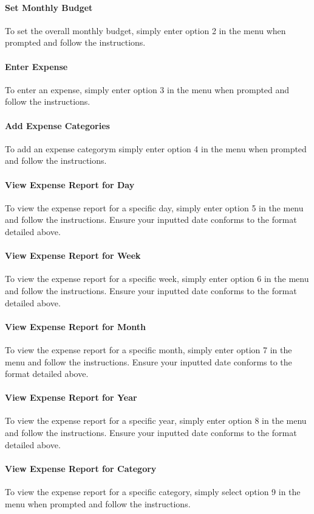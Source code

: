 \documentclass[12pt]{article}
\begin{document}
  \paragraph{Set Monthly Budget}
  To set the overall monthly budget, simply enter option 2 in the menu when prompted and follow the instructions.
  \paragraph{Enter Expense}
  To enter an expense, simply enter option 3 in the menu when prompted and follow the instructions.
  \paragraph{Add Expense Categories}
  To add an expense categorym simply enter option 4 in the menu when prompted and follow the instructions.
  \paragraph{View Expense Report for Day}
  To view the expense report for a specific day, simply enter option 5 in the menu and follow the instructions. Ensure your inputted date conforms to the format detailed above.
  \paragraph{View Expense Report for Week}
  To view the expense report for a specific week, simply enter option 6 in the menu and follow the instructions. Ensure your inputted date conforms to the format detailed above.
  \paragraph{View Expense Report for Month}
  To view the expense report for a specific month, simply enter option 7 in the menu and follow the instructions. Ensure your inputted date conforms to the format detailed above.
  \paragraph{View Expense Report for Year}
  To view the expense report for a specific year, simply enter option 8 in the menu and follow the instructions. Ensure your inputted date conforms to the format detailed above.
  \paragraph{View Expense Report for Category}
  To view the expense report for a specific category, simply select option 9 in the menu when prompted and follow the instructions.
\end{document}
